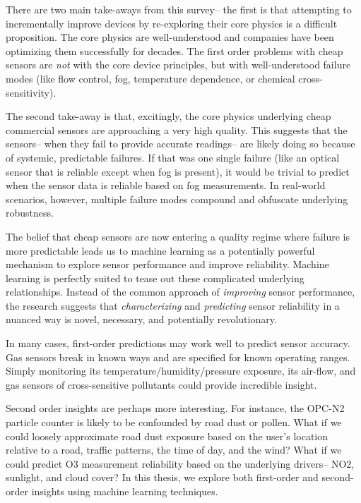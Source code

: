 There are two main take-aways from this survey-- the first is that attempting to incrementally improve devices by re-exploring their core physics is a difficult proposition.  The core physics are well-understood and companies have been optimizing them successfully for decades.  The first order problems with cheap sensors are \textit{not} with the core device principles, but with well-understood failure modes (like flow control, fog, temperature dependence, or chemical cross-sensitivity).  

The second take-away is that, excitingly, the core physics underlying cheap commercial sensors are approaching a very high quality.  This suggests that the sensors-- when they fail to provide accurate readings-- are likely doing so because of systemic, predictable failures.  If that was one single failure (like an optical sensor that is reliable except when fog is present), it would be trivial to predict when the sensor data is reliable based on fog measurements.  In real-world scenarios, however, multiple failure modes compound and obfuscate underlying robustness.

The belief that cheap sensors are now entering a quality regime where failure is more predictable leads us to machine learning as a potentially powerful mechanism to explore sensor performance and improve reliability.  Machine learning is perfectly suited to tease out these complicated underlying relationships.  Instead of the common approach of \textit{improving} sensor performance, the research suggests that \textit{characterizing} and \textit{predicting} sensor reliability in a nuanced way is novel, necessary, and potentially revolutionary.

In many cases, first-order predictions may work well to predict sensor accuracy.  Gas sensors break in known ways and are specified for known operating ranges.  Simply monitoring its temperature/humidity/pressure exposure, its air-flow, and gas sensors of cross-sensitive pollutants could provide incredible insight.  

Second order insights are perhaps more interesting.  For instance, the OPC-N2 particle counter is likely to be confounded by road dust or pollen.  What if we could loosely approximate road dust exposure based on the user's location relative to a road, traffic patterns, the time of day, and the wind?  What if we could predict O3 measurement reliability based on the underlying drivers-- NO2, sunlight, and cloud cover? In this thesis, we explore both first-order and second-order insights using machine learning techniques.

